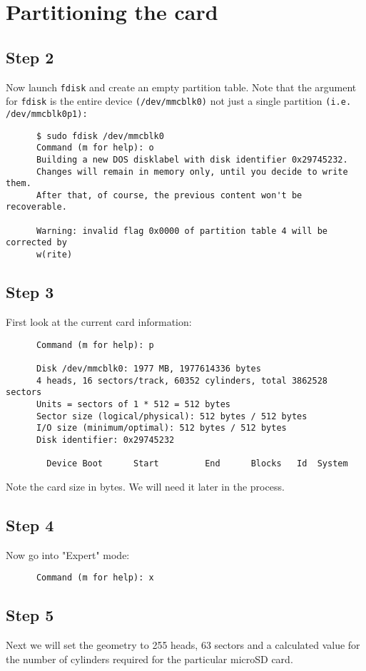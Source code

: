 \documentclass{article}
\begin{document}
   \section*{Partitioning the card}
   \subsection*{Step 2}
      Now launch \texttt{fdisk} and create an empty partition table. Note that
      the argument for \texttt{fdisk} is the entire device
      \texttt{(/dev/mmcblk0)} not just a single partition \texttt{(i.e.
      /dev/mmcblk0p1):} 
      \begin{verbatim}
      $ sudo fdisk /dev/mmcblk0
      Command (m for help): o 
      Building a new DOS disklabel with disk identifier 0x29745232.
      Changes will remain in memory only, until you decide to write them.
      After that, of course, the previous content won't be recoverable.

      Warning: invalid flag 0x0000 of partition table 4 will be corrected by
      w(rite)
      \end{verbatim}
   \subsection*{Step 3}
      First look at the current card information: 
      \begin{verbatim}
      Command (m for help): p 

      Disk /dev/mmcblk0: 1977 MB, 1977614336 bytes
      4 heads, 16 sectors/track, 60352 cylinders, total 3862528 sectors
      Units = sectors of 1 * 512 = 512 bytes
      Sector size (logical/physical): 512 bytes / 512 bytes
      I/O size (minimum/optimal): 512 bytes / 512 bytes
      Disk identifier: 0x29745232

        Device Boot      Start         End      Blocks   Id  System
      \end{verbatim}
      Note the card size in bytes. We will need it later in the process.
   \subsection*{Step 4}
      Now go into "Expert" mode: 
      \begin{verbatim}
      Command (m for help): x
      \end{verbatim}
   \subsection*{Step 5}
      Next we will set the geometry to 255 heads, 63 sectors and a calculated
      value for the number of cylinders required for the particular microSD
      card. \\
      
\end{document}

